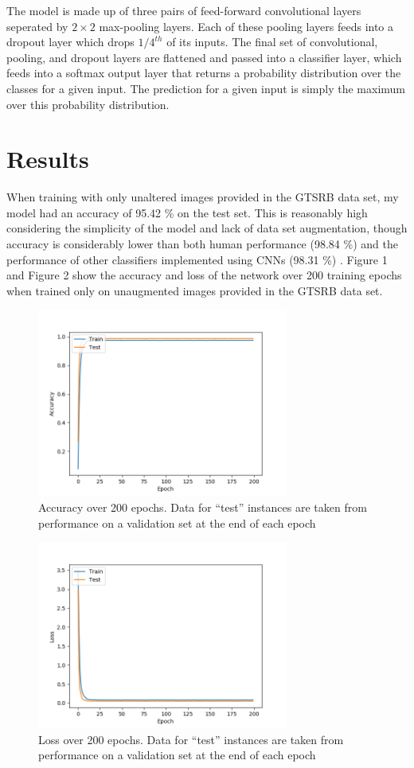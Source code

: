 \documentclass[letterpaper,twocolumn,10pt]{article}
\begin{document}
The model is made up of three pairs of feed-forward convolutional layers seperated by $2 \times 2$ max-pooling layers. Each of these pooling layers feeds into a dropout layer which drops $1/4^{th}$ of its inputs. The final set of convolutional, pooling, and dropout layers are flattened and passed into a classifier layer, which feeds into a softmax output layer that returns a probability distribution over the classes for a given input. The prediction for a given input is simply the maximum over this probability distribution.

\section{Results}

When training with only unaltered images provided in the GTSRB data set, my model had an accuracy of 95.42 \% on the test set. This is reasonably high considering the simplicity of the model and lack of data set augmentation, though accuracy is considerably lower than both human performance (98.84 \%) and the performance of other classifiers implemented using CNNs (98.31 \%) \cite{sermanet_convolutional_2012, sermanet_traffic_2011, stallkamp_german_2011, stallkamp_man_2012}. Figure 1 and Figure 2 show the accuracy and loss of the network over 200 training epochs when trained only on unaugmented images provided in the GTSRB data set. 

\begin{figure}
\includegraphics[width=3.25in]{accuracy}
\caption{Accuracy over 200 epochs. Data for ``test'' instances are taken from performance on a validation set at the end of each epoch}
\end{figure}

\begin{figure}
\includegraphics[width=3.25in]{loss}
\caption{Loss over 200 epochs. Data for ``test'' instances are taken from performance on a validation set at the end of each epoch}
\end{figure}
\end{document}
